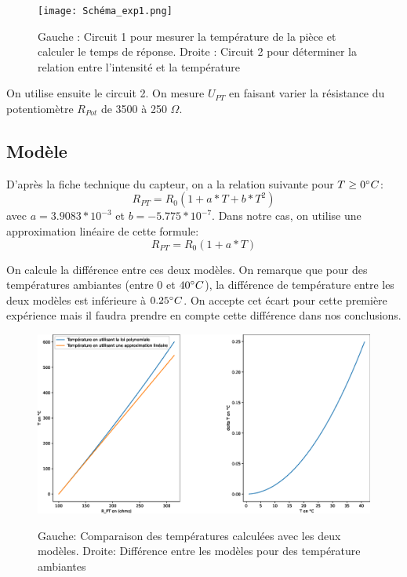 \documentclass[12pt]{article}
\begin{document}
\newpage
\begin{figure}[h!]
	\begin{center}
		\texttt{[image: Schéma\_exp1.png]}
		\label{Schéma_exp1}
		\caption{Gauche : Circuit 1 pour mesurer la température de la pièce et calculer le temps de réponse. Droite : Circuit 2 pour déterminer la relation entre l'intensité et la température}
	\end{center}
\end{figure}

On utilise ensuite le circuit 2. On mesure $U_{PT}$ en faisant varier la résistance du potentiomètre $R_{Pot}$ de 3500 à 250 $\Omega$.

\subsection{Modèle}
D'après la fiche technique du capteur, on a la relation suivante pour $T\geq 0\degree C$:
\begin{equation}
R_{PT}=R_0(1+a*T+b*T^2)
\end{equation}
avec $a=3.9083*10^{-3}$ et $b=-5.775*10^{-7}$. Dans notre cas, on utilise une approximation linéaire de cette formule:
\begin{equation}
R_{PT}=R_0(1+a*T)
\label{Modèle_linéaire}
\end{equation}

On calcule la différence entre ces deux modèles. On remarque que pour des températures ambiantes (entre $0$ et $40\degree C$), la différence de température entre les deux modèles est inférieure à $0.25\degree C$. On accepte cet écart pour cette première expérience mais il faudra prendre en compte cette différence dans nos conclusions. 
\begin{figure}[h!]
	\begin{center}
		\includegraphics[scale=0.3]{Comparaison.eps}
		\label{Comparaison}
		\caption{Gauche: Comparaison des températures calculées avec les deux modèles. Droite: Différence entre les modèles pour des température ambiantes}
	\end{center}
\end{figure}
\end{document}
